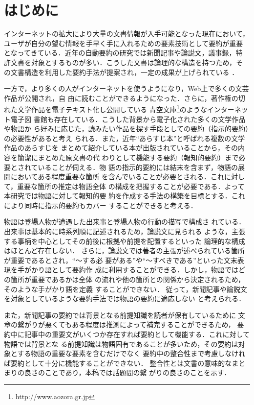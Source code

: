 \documentclass[japanese]{jnlp_1.4}
\begin{document}
\maketitle


 \section{はじめに}\label{hajime}

 インターネットの拡大により大量の文書情報が入手可能となった現在において，
 ユーザが自分の望む情報を手早く手に入れるための要素技術として要約が重要
 となってきている．近年の自動要約の研究では新聞記事や論説文，議事録，特
 許文書を対象とするものが多い．こうした文書は論理的な構造を持つため，そ
 の文書構造を利用した要約手法が提案され，一定の成果が上げられている
 \cite{yamamoto1995,hatayama2002}．

 一方で，より多くの人がインターネットを使うようになり，Web上で多くの文芸作品が公開され，自
 由に読むことができるようになった．さらに，著作権の切れた文学作品を電子テキスト化し公開している
 青空文庫\footnote{http://www.aozora.gr.jp}のようなインターネット電子図
 書館も存在している．こうした背景から電子化された多くの文学作品や物語か
 ら好みに応じた，読みたい作品を探す手段としての要約（指示的要約）の必要性があると考え
 られる．また，近年``あらすじ本''と呼ばれる複数の文学作品のあらすじを
 まとめて紹介している本が出版されていることから，その内容を簡潔にまとめた原文書の代
 わりとして機能する要約（報知的要約）まで必要とされていることが伺える．物
 語の指示的要約には結末を含まず，物語の展開においてある程度重要な箇所
 を含んでいることが必要とされる．これに対して，重要な箇所の推定は物語全体
 の構成を把握することが必要である．よって本研究では物語に対して報知的要
 約を作成する手法の構築を目標とする．これにより同時に指示的要約もカバー
 することができると考える．

物語は登場人物が遭遇した出来事と登場人物の行動の描写で構成さ
 れている．出来事は基本的に時系列順に記述されるため，論説文に見られる
 ような，主張する事柄を中心としてその前後に根拠や前提を配置するといった
 論理的な構成はほとんど存在しない．
 さらに，論説文では著者の主張が述べられている箇所が重要であるとされ，“〜する必
 要がある”や“〜すべきである”といった文末表現を手がかり語として要約作
 成に利用することができる．しかし，物語ではどの箇所が重要であるかは全体
 の流れや他の箇所との関係から決定されるため，そのような手がかり語を定義
 することができない．
 従って，新聞記事や論説文を対象としているような要約手法では物語の要約に適応しない
 と考えられる．

 また，新聞記事の要約では背景となる前提知識を読者が保有しているために
 文章の繋がりが悪くてもある程度は推測によって補完することができるため，
 要約中に記事中の重要文がいくつか存在すれば要約として機能する．これに対して物語では背景とな
 る前提知識は物語固有であることが多いため，その要約は対象とする物語の重要な要素を含むだけでなく
 要約中の整合性まで考慮しなければ要約として十分に機能することができない．
 整合性とは文書の意味的なまとまりの良さのことであり，本稿では話題間の繋
 がりの良さのことを示す．
\end{document}
